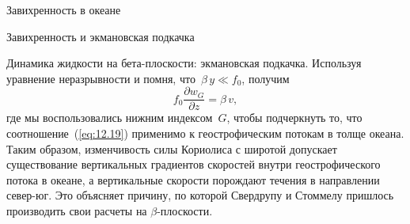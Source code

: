 \begin{chapter}{Завихренность в океане}
\begin{section}{Завихренность и экмановская подкачка}
\begin{paragraph}{Динамика жидкости на бета-плоскости: экмановская подкачка.}
Используя уравнение неразрывности и помня, что~$\beta\, y \ll f_0$,
получим
\begin{equation}\label{eq:12.19}
 f_0 \frac{\partial{w_G}}{\partial{z}} = \beta \, v,
\end{equation}
где мы воспользовались нижним индексом~$G$, чтобы подчеркнуть то, 
что соотношение~(\ref{eq:12.19}) применимо к геострофическим потокам%
в толще океана. Таким образом, изменчивость силы Кориолиса с широтой допускает
существование вертикальных градиентов скоростей внутри геострофического 
потока в океане, а вертикальные скорости порождают течения в направлении
север-юг. Это объясняет причину, по которой Свердрупу и Стоммелу пришлось
производить свои расчеты на $\beta$-плоскости.
%
\end{paragraph}


\end{section}
\end{chapter}
